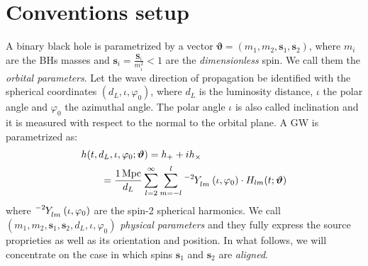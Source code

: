 \section{Conventions setup}
\label{sec:setup}
A binary black hole is parametrized by a vector $ \boldsymbol{\vartheta} = (m_1,m_2, \mathbf{s}_1,\mathbf{s}_2) $, where $m_i$ are the BHs masses and $\mathbf{s}_i = \frac{\mathbf{S}_i}{m_i^2} <1$ are the \textit{dimensionless} spin. 
We call them the \textit{orbital parameters}.
Let the wave direction of propagation be identified with the spherical coordinates $(d_L, \iota, \varphi_0)$, where $d_L$ is the luminosity distance, $\iota$ the polar angle and $\varphi_0$ the azimuthal angle. The polar angle $\iota$ is also called inclination and it is measured with respect to the normal to the orbital plane.
A GW is parametrized as:
\begin{align} \label{eq:h_parametrization}
	&h(t, d_L,\iota,\varphi_0; \boldsymbol{\vartheta}) = h_+ + i h_\times \nonumber \\
		&\qquad= {\frac{\SI{1}{Mpc}}{d_L}} \sum_{l = 2}^{\infty} \sum_{m = -l}^{l} \tensor[^{-2}]{Y}{_{l m}}(\iota, \varphi_0) \cdot H_{lm}(t; \boldsymbol{\vartheta})
\end{align}
where $\tensor[^{-2}]{Y}{_{l m}}(\iota, \varphi_0)$ are the spin-2 spherical harmonics.
We call $(m_1,m_2, \mathbf{s}_1,\mathbf{s}_2, d_L,\iota,\varphi_0)$ \textit{physical parameters} and they fully express the source 
proprieties as well as its orientation and position. In what follows, we will concentrate on the case in which 
spins $\mathbf{s}_1$ and $\mathbf{s}_2$ are \textit{aligned}. 

